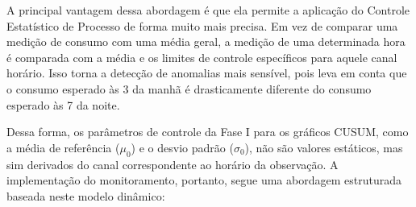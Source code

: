 A principal vantagem dessa abordagem é que ela permite a aplicação do Controle Estatístico de Processo de forma muito mais precisa. Em vez de comparar uma medição de consumo com uma média geral, a medição de uma determinada hora é comparada com a média e os limites de controle específicos para aquele canal horário. Isso torna a detecção de anomalias mais sensível, pois leva em conta que o consumo esperado às 3 da manhã é drasticamente diferente do consumo esperado às 7 da noite.

Dessa forma, os parâmetros de controle da Fase I para os gráficos CUSUM, como a média de referência ($\mu_0$) e o desvio padrão ($\sigma_0$), não são valores estáticos, mas sim derivados do canal correspondente ao horário da observação. A implementação do monitoramento, portanto, segue uma abordagem estruturada baseada neste modelo dinâmico:

